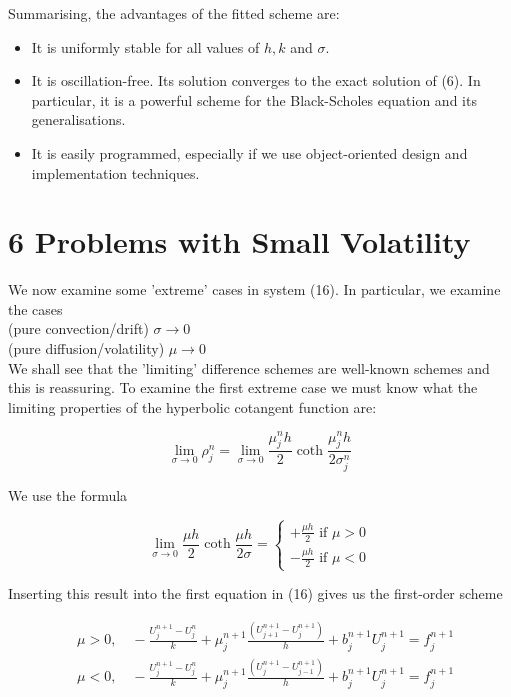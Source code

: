 \documentclass[10pt]{article}
\begin{document}
Summarising, the advantages of the fitted scheme are:

\begin{itemize}
  \item It is uniformly stable for all values of $h, k$ and $\sigma$.
  \item It is oscillation-free. Its solution converges to the exact solution of (6). In particular, it is a powerful scheme for the Black-Scholes equation and its generalisations.
  \item It is easily programmed, especially if we use object-oriented design and implementation techniques.
\end{itemize}

\section*{6 Problems with Small Volatility}
We now examine some 'extreme' cases in system (16). In particular, we examine the cases\\
(pure convection/drift) $\sigma \rightarrow 0$\\
(pure diffusion/volatility) $\mu \rightarrow 0$\\
We shall see that the 'limiting' difference schemes are well-known schemes and this is reassuring. To examine the first extreme case we must know what the limiting properties of the hyperbolic cotangent function are:

$$
\lim _{\sigma \rightarrow 0} \rho_{j}^{n}=\lim _{\sigma \rightarrow 0} \frac{\mu_{j}^{n} h}{2} \operatorname{coth} \frac{\mu_{j}^{n} h}{2 \sigma_{j}^{n}}
$$

We use the formula

$$
\lim _{\sigma \rightarrow 0} \frac{\mu h}{2} \operatorname{coth} \frac{\mu h}{2 \sigma}=\left\{\begin{array}{l}
+\frac{\mu h}{2} \text { if } \mu>0 \\
-\frac{\mu h}{2} \text { if } \mu<0
\end{array}\right.
$$

Inserting this result into the first equation in (16) gives us the first-order scheme

$$
\begin{aligned}
& \mu>0, \quad-\frac{U_{j}^{n+1}-U_{j}^{n}}{k}+\mu_{j}^{n+1} \frac{\left(U_{j+1}^{n+1}-U_{j}^{n+1}\right)}{h}+b_{j}^{n+1} U_{j}^{n+1}=f_{j}^{n+1} \\
& \mu<0, \quad-\frac{U_{j}^{n+1}-U_{j}^{n}}{k}+\mu_{j}^{n+1} \frac{\left(U_{j}^{n+1}-U_{j-1}^{n+1}\right)}{h}+b_{j}^{n+1} U_{j}^{n+1}=f_{j}^{n+1}
\end{aligned}
$$
\end{document}
